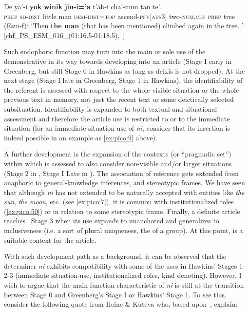 \documentclass[output=paper
,modfonts
,nonflat]{langsci/langscibook}
\begin{document}
\ea  \label{ex:pico:55}

\gll De ya'-i \textbf{yok} \textbf{winik} \textbf{jin-i='a} t'äb-i cha'-num tan te'.\\
\textsc{prep} \textsc{sd}-\textsc{dist} {little} {man} \textsc{dem}-\textsc{dist}=\textsc{top} {ascend}-\textsc{pfv[abs3]} two-\textsc{num.clf} \textsc{prep} tree \\
\glt (Esm-f): `Then \textbf{the man} (that has been mentioned) climbed again in the tree. ' [chf\_PS\_ESM\_016\_(01:16.5-01:18.5),~\citealt{Delgado-Galvan2018archive}]

\z 

Such endophoric function may turn into the main or sole use of the demonstrative in its way towards developing into an article (Stage I early in Greenberg, but still Stage 0 in Hawkins as long as deixis is not dropped).
At the next stage (Stage I late in Greenberg, Stage 1 in Hawkins), the identifiability of the referent is assessed with respect to the whole visible situation or the whole previous text in memory, not just the recent text or some deictically selected subsituation. Identifiability is expanded to both textual and situational assessment and therefore the article use is restricted to  or to the immediate situation (for an immediate situation use of \textit{ni}, consider that its insertion is indeed possible in an example as \ref{ex:pico:9} above). 

A further development is the expansion of the contexts (or ``pragmatic set'') within which  is assessed to also consider non-visible and/or larger situations (Stage 2 in \citealt{Hawkins2004}, Stage I Late in \citealt{Greenberg1978howgender}). The association of reference gets extended from anaphoric to general-knowledge inferences, and stereotypic frames. We have seen that although \textit{ni} has not extended to be naturally accepted with entities like \textit{the sun}, \textit{the moon}, etc. (see \ref{ex:pico:7}), it is common with institutionalized roles (\ref{ex:pico:50}) or in relation to some stereotypic frame. 
Finally, a definite article reaches~ Stage 3 when its use expands to unanchored  and generalizes to inclusiveness (i.e. a sort of plural uniqueness, the  of a group). At this point,  is a suitable context for the article.

With such development path as a background, it can be observed that the determiner \textit{ni} exhibits compatibility with some of the uses in Hawkins' Stages 1-2-3 (immediate situation-use, institutionalized roles, kind denoting). 
However, I wish to argue that the main function characteristic of \textit{ni} is still at the transition between Stage 0 and Greenberg's Stage I or Hawkins' Stage 1. To see this, consider the following quote from Heine \& Kuteva who, based upon~\citet[][96, 128-129]{Diessel1999}, explain:
\end{document}
